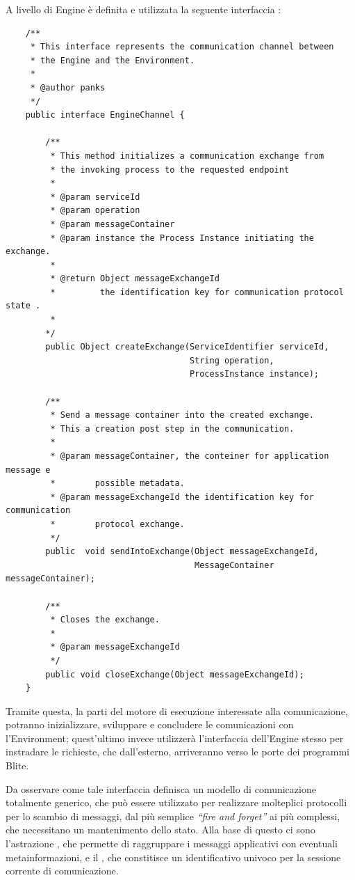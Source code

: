 \begin{enumerate}
  A livello di Engine è definita e utilizzata la seguente interfaccia
  :
	\begin{lstlisting}
	/**
	 * This interface represents the communication channel between 
 	 * the Engine and the Environment.  
 	 * 
 	 * @author panks
 	 */
	public interface EngineChannel {
		
   		/**
      	 * This method initializes a communication exchange from 
     	 * the invoking process to the requested endpoint
     	 * 
         * @param serviceId
     	 * @param operation
     	 * @param messageContainer
     	 * @param instance the Process Instance initiating the exchange.
     	 * 
     	 * @return Object messageExchangeId 
     	 *         the identification key for communication protocol state .
     	 *         
     	*/
     	public Object createExchange(ServiceIdentifier serviceId, 
        	                         String operation,
            	                     ProcessInstance instance);
   
    	/**
     	 * Send a message container into the created exchange. 
     	 * This a creation post step in the communication.
     	 * 
     	 * @param messageContainer, the conteiner for application message e
         *        possible metadata.
         * @param messageExchangeId the identification key for communication 
	     *        protocol exchange.
     	 */
    	public  void sendIntoExchange(Object messageExchangeId,
                                      MessageContainer messageContainer);

    	/**
     	 * Closes the exchange.
     	 * 
     	 * @param messageExchangeId
     	 */
    	public void closeExchange(Object messageExchangeId);
	}

  	\end{lstlisting} 

	Tramite questa, la parti del motore di esecuzione interessate alla
	comunicazione, potranno inizializzare, sviluppare e concludere le comunicazioni
	con l'Environment; quest'ultimo invece utilizzerà l'interfaccia dell'Engine
	stesso per instradare le richieste, che dall'esterno, arriveranno verso
	le porte dei programmi Blite.
	
	Da osservare come tale interfaccia definisca un modello di comunicazione
	totalmente generico, che può essere utilizzato per realizzare molteplici
	protocolli per lo scambio di messaggi, dal più semplice \emph{``fire and
	forget''} ai più complessi, che necessitano un mantenimento dello stato.
	Alla base di questo ci sono l'astrazione , che
	permette di raggruppare i messaggi applicativi con eventuali
	metainformazioni, e il , che constitisce un
	identificativo univoco per la sessione corrente di comunicazione.
	

\end{enumerate}
